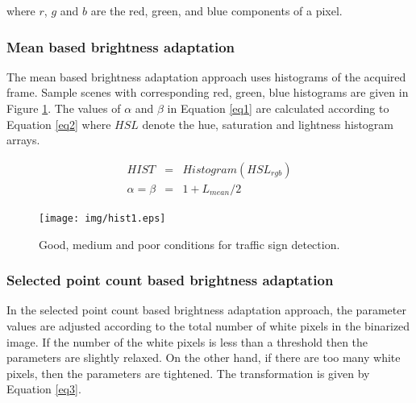 \documentclass[review,number]{elsarticle}
\begin{document}
\noindent where $r$, $g$ and $b$ are the red, green, and blue components of a pixel.
 
\subsubsection{Mean based brightness adaptation}
The mean based brightness adaptation approach uses histograms of the acquired frame. Sample scenes with corresponding red, green, blue histograms are given in Figure \ref{fig:hist1}. The values of $\alpha$ and $\beta$ in Equation \ref{eq1} are calculated according to Equation \ref{eq2} where $HSL$ denote the hue, saturation and lightness histogram arrays.

\begin{eqnarray}
\label{eq2}
HIST &=& Histogram(HSL_{rgb}) \\
\nonumber \alpha = \beta &=& 1 + L_{mean}/2
\end{eqnarray}

\begin{figure}[H]
\begin{center}
\texttt{[image: img/hist1.eps]}
\caption{Good, medium and poor conditions for traffic sign detection.}
\label{fig:hist1}
\end{center}
\end{figure}

\subsubsection{Selected point count based brightness adaptation}
In the selected point count based brightness adaptation approach, the parameter values are adjusted according to the total number of white pixels in the binarized image. If the number of the white pixels is less than a threshold then the parameters are slightly relaxed. On the other hand, if there are too many white pixels, then the parameters are tightened. The transformation is given by Equation \ref{eq3}.
\end{document}
